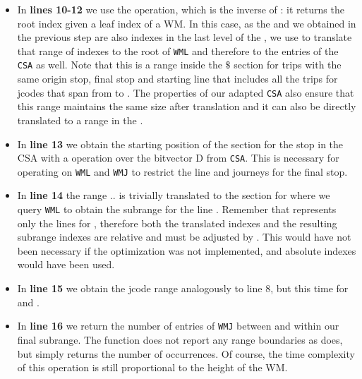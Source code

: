 \begin{itemize}
        \item In \textbf{lines 10-12} we use the  operation, which is the inverse of : it returns the root index given a leaf index of a WM. In this case, as the  and  we obtained in the previous step are also indexes in the last level of the , we use  to translate that range of indexes to the root of \texttt{WML} and therefore to the entries of the \texttt{CSA} as well. Note that this is a range inside the $\$$ section for trips with the same origin stop, final stop and starting line that includes all the trips for jcodes that span from  to . The properties of our adapted \texttt{CSA} also ensure that this range maintains the same size after translation and it can also be directly translated to a range in the .
        
        \item In \textbf{line 13} we obtain the starting position of the section for the stop  in the CSA with a  operation over the bitvector D from \texttt{CSA}. This is necessary for operating on \texttt{WML} and \texttt{WMJ} to restrict the line and journeys for the final stop.
        
        \item In \textbf{line 14} the range $..$ is trivially translated to the section for  where we query \texttt{WML} to obtain the subrange for the line . Remember that  represents only the lines for , therefore both the translated indexes and the resulting subrange indexes are relative and must be adjusted by . This would have not been necessary if the optimization was not implemented, and absolute indexes would have been used. 
        
        \item In \textbf{line 15} we obtain the jcode range analogously to line 8, but this time for  and .
        
        \item In \textbf{line 16} we return the number of entries of \texttt{WMJ} between  and  within our final subrange. The function  does not report any range boundaries as  does, but simply returns the number of occurrences. Of course, the time complexity of this operation is still proportional to the height of the WM.
    \end{itemize}
    
